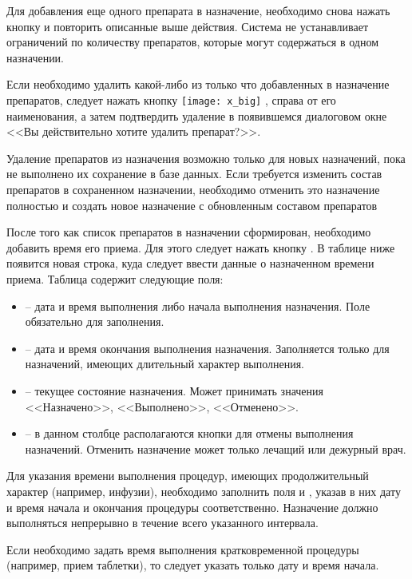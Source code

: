 Для добавления еще одного препарата в назначение, необходимо снова нажать кнопку   и повторить описанные выше действия. Система не устанавливает ограничений по количеству препаратов, которые могут содержаться в одном назначении.

Если необходимо удалить какой-либо из только что добавленных в назначение препаратов, следует нажать кнопку \texttt{[image: x\_big]} , справа от его наименования, а затем подтвердить удаление в появившемся диалоговом окне <<Вы действительно хотите удалить препарат?>>.

\begin{vnim}
 Удаление препаратов из назначения возможно только для новых назначений, пока не выполнено их сохранение в базе данных. Если требуется изменить состав препаратов в сохраненном назначении, необходимо отменить это назначение  полностью и создать новое назначение с обновленным составом препаратов
\end{vnim}
 
После того как список препаратов в назначении сформирован, необходимо добавить время его приема. Для этого следует нажать кнопку  . В таблице ниже появится новая строка, куда следует ввести данные о назначенном времени приема. Таблица содержит следующие поля:
\begin{itemize}
 \item {} – дата и время выполнения либо начала выполнения назначения. Поле обязательно для заполнения.
 \item {} – дата и время окончания выполнения назначения. Заполняется только для назначений, имеющих длительный характер выполнения. 
 \item {} – текущее состояние назначения. Может принимать значения <<Назначено>>, <<Выполнено>>, <<Отменено>>.
 \item {} – в данном столбце располагаются кнопки   для отмены выполнения назначений. Отменить назначение может только лечащий или дежурный врач.
\end{itemize}
 
Для указания времени выполнения процедур, имеющих продолжительный характер (например, инфузии), необходимо заполнить поля  и , указав в них дату и время начала и окончания процедуры соответственно. Назначение должно выполняться непрерывно в течение всего указанного интервала.

Если необходимо задать время выполнения кратковременной процедуры (например, прием таблетки), то следует указать только дату и время начала.

